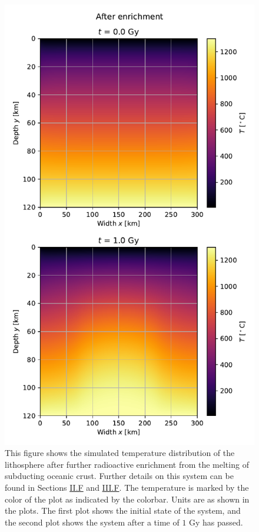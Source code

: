 \documentclass[reprint,english,notitlepage]{revtex4-1}  %
\begin{document}
\begin{figure}[H]
\centering
\includegraphics[width=\columnwidth]{../data/2D_heat_after.pdf}
\caption{This figure shows the simulated temperature distribution of the lithosphere after further radioactive enrichment from the melting of subducting oceanic crust. Further details on this system can be found in Sections \hyperref[sec:formalism_temp_dist_lithosphere]{II.F} and \hyperref[sec:method_heat_sim]{III.F}. The temperature is marked by the color of the plot as indicated by the colorbar. Units are as shown in the plots. The first plot shows the initial state of the system, and the second plot shows the system after a time of $1$ Gy has passed.} \label{fig:lithosphere_after_enrichment}
\end{figure}
\end{document}
